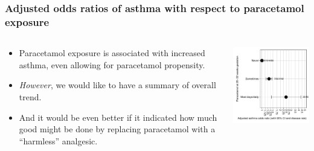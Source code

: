 \documentclass[11pt]{beamer}
\begin{document}
\begin{frame}
\frametitle{Adjusted odds ratios of asthma with respect to paracetamol exposure}

\begin{columns}[t]
\begin{column}{48mm}
\begin{itemize}
\item<2-> Paracetamol exposure is associated with increased asthma,
even allowing for paracetamol propensity.
\item<3-> \textit{However}, we would like to have a summary of overall trend.
\item<4-> And it would be even better if it indicated how much good might be done
by replacing paracetamol with a ``harmless'' analgesic.
\end{itemize}
\end{column}
\begin{column}[T]{80mm}
\includegraphics[width=76mm]{figseq2.pdf}
\end{column}
\end{columns}

\end{frame}
\end{document}
